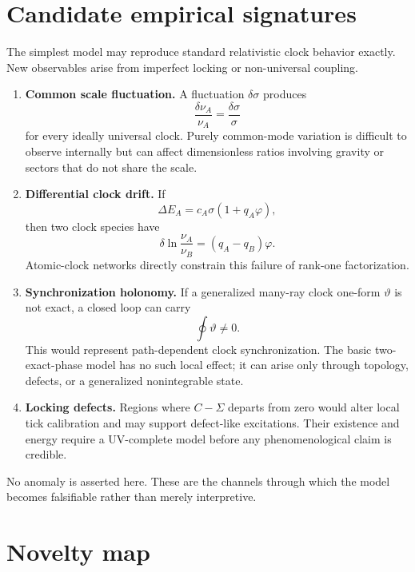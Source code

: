 \documentclass[11pt,a4paper]{article}
\newcommand{\Ccross}{C}
\begin{document}
\section{Candidate empirical signatures}

The simplest model may reproduce standard relativistic clock behavior exactly. New observables arise from imperfect locking or non-universal coupling.

\begin{enumerate}
  \item \textbf{Common scale fluctuation.} A fluctuation $\delta\sigma$ produces
  \[
  \frac{\delta\nu_A}{\nu_A}=\frac{\delta\sigma}{\sigma}
  \]
  for every ideally universal clock. Purely common-mode variation is difficult to observe internally but can affect dimensionless ratios involving gravity or sectors that do not share the scale.

  \item \textbf{Differential clock drift.} If
  \[
  \Delta E_A=c_A\sigma(1+q_A\varphi),
  \]
  then two clock species have
  \[
  \delta\ln\frac{\nu_A}{\nu_B}=(q_A-q_B)\varphi.
  \]
  Atomic-clock networks directly constrain this failure of rank-one factorization.

  \item \textbf{Synchronization holonomy.} If a generalized many-ray clock one-form $\vartheta$ is not exact, a closed loop can carry
  \[
  \oint\vartheta\neq0.
  \]
  This would represent path-dependent clock synchronization. The basic two-exact-phase model has no such local effect; it can arise only through topology, defects, or a generalized nonintegrable state.

  \item \textbf{Locking defects.} Regions where $\Ccross-\Sigma$ departs from zero would alter local tick calibration and may support defect-like excitations. Their existence and energy require a UV-complete model before any phenomenological claim is credible.
\end{enumerate}

No anomaly is asserted here. These are the channels through which the model becomes falsifiable rather than merely interpretive.

\section{Novelty map}
\end{document}
